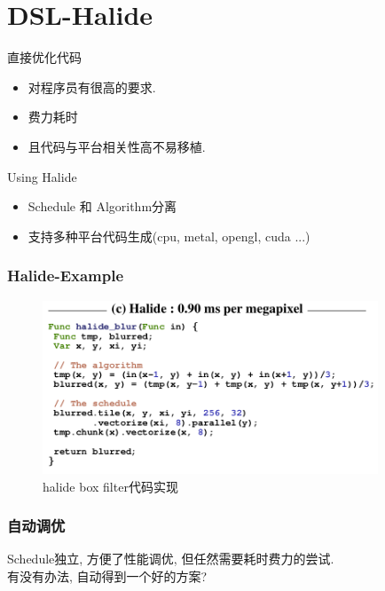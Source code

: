 \documentclass[hyperref]{beamer}
\begin{document}
\section{DSL-Halide}
\begin{frame}
  \begin{block}{直接优化代码}
    \begin{itemize}
    \item 对程序员有很高的要求.
    \item 费力耗时
    \item 且代码与平台相关性高不易移植.
    \end{itemize}
  \end{block}
  
  \begin{exampleblock}{Using Halide}
    \begin{itemize}
    \item Schedule 和 Algorithm分离
    \item 支持多种平台代码生成(cpu, metal, opengl, cuda ...)
    \end{itemize}
  \end{exampleblock}
\end{frame}

\begin{frame}
  \frametitle{Halide-Example}
  \begin{figure}[H]
    \centering
    \includegraphics[width=10cm]{halide_box_filter.png}
    \caption{halide box filter代码实现}
    \label{fig:halide-box-filter}
  \end{figure}
\end{frame}

\begin{frame}
  \frametitle{自动调优}
  Schedule独立, 方便了性能调优, 但任然需要耗时费力的尝试.\\

  有没有办法, 自动得到一个好的方案?
\end{frame}
\end{document}
